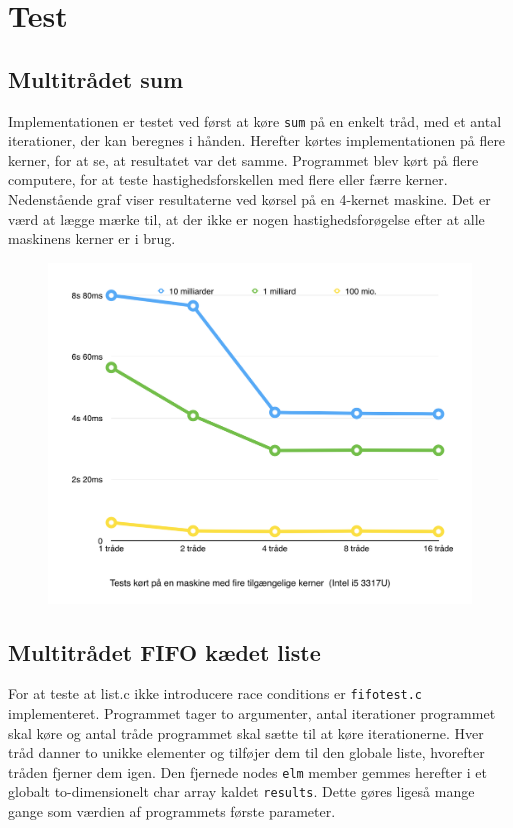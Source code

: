 \section{Test}

\subsection{Multitrådet sum}
Implementationen er testet ved først at køre \texttt{sum} på en enkelt tråd, med et antal iterationer, der kan beregnes i hånden.
Herefter kørtes implementationen på flere kerner, for at se, at resultatet var det samme. 
Programmet blev kørt på flere computere, for at teste hastighedsforskellen med flere eller færre kerner. 
Nedenstående graf viser resultaterne ved kørsel på en 4-kernet maskine. Det er værd at lægge mærke til, at der ikke er nogen hastighedsforøgelse efter at alle maskinens kerner er i brug. 

\begin{figure}[h!]
\center
\includegraphics[width=\linewidth]{figures/graph.png}
\end{figure}

\subsection{Multitrådet FIFO kædet liste}
For at teste at list.c ikke introducere race conditions er \texttt{fifotest.c} implementeret. Programmet tager to argumenter, antal iterationer programmet skal køre og antal tråde programmet skal sætte til at køre iterationerne. Hver tråd danner to unikke elementer og tilføjer dem til den globale liste, hvorefter tråden fjerner dem igen. Den fjernede nodes \texttt{elm} member gemmes herefter i et globalt to-dimensionelt char array kaldet \texttt{results}. Dette gøres ligeså mange gange som værdien af programmets første parameter. \\

